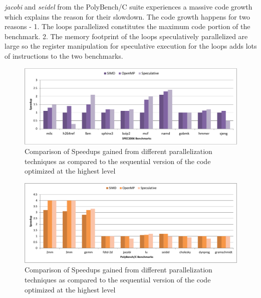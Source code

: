 \documentclass[10pt]{report}          %
\begin{document}
\textit{jacobi} and \textit{seidel} from the PolyBench/C suite experiences a massive code growth which explains the reason for their slowdown.  The code growth happens for two reasons - 1. The loops parallelized constitutes the maximum code portion of the benchmark. 2. The memory footprint of the loops speculatively parallelized are large so the register manipulation for speculative execution for the loops adds lots of instructions to the two benchmarks.

\begin{figure}
\centering
\includegraphics[scale=0.56]{./pdf/spec2006_O5.pdf}
\caption{Comparison of Speedups gained from different parallelization techniques as compared to the sequential version of the code optimized at the highest level }
\label{fig:speedup_O5}
\end{figure}

\begin{figure}
\centering
\includegraphics[scale=0.56]{./pdf/poly_O5.pdf}
\caption{Comparison of Speedups gained from different parallelization techniques as compared to the sequential version of the code optimized at the highest level }
\label{fig:poly_O5}
\end{figure}
\end{document}
